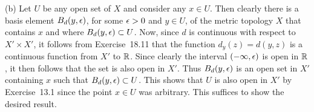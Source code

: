 {  (b) Let $U$ be any open set of $X$ and consider any $x \in U$.
  Then clearly there is a basis element $B_d(y, \epsilon)$, for some $\epsilon > 0$ and $y \in U$, of the metric topology $X$ that contains $x$ and where $B_d(y, \epsilon) \subset U$.
  Now, since $d$ is continuous with respect to $X' \times X'$, it follows from Exercise~18.11 that the function $d_y(z) = d(y,z)$ is a continuous function from $X'$ to ${\mathbb{R}}$.
  Since clearly the interval $(-\infty, \epsilon)$ is open in ${\mathbb{R}}$, it then follows that the set
  is also open in $X'$.
  Thus $B_d(y,\epsilon)$ is an open set in $X'$ containing $x$ such that $B_d(y, \epsilon) \subset U$.
  This shows that $U$ is also open in $X'$ by Exercise~13.1 since the point $x \in U$ was arbitrary.
  This suffices to show the desired result.
}

